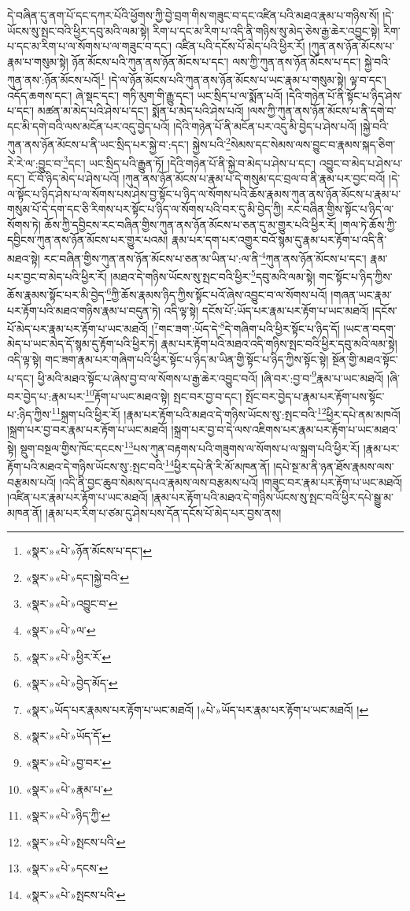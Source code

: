 དེ་བཞིན་དུ་ནག་པོ་དང་དཀར་པོའི་ཕྱོགས་ཀྱི་བྱེ་བྲག་གིས་གཟུང་བ་དང་འཛིན་པའི་མཐའ་རྣམ་པ་གཉིས་སོ། །དེ་ཡོངས་སུ་སྤང་བའི་ཕྱིར་དབུ་མའི་ལམ་སྟེ། རིག་པ་དང་མ་རིག་པ་འདི་ནི་གཉིས་སུ་མེད་ཅེས་རྒྱ་ཆེར་འབྱུང་སྟེ། རིག་པ་དང་མ་རིག་པ་ལ་སོགས་པ་ལ་གཟུང་བ་དང་། འཛིན་པའི་དངོས་པོ་མེད་པའི་ཕྱིར་རོ། །ཀུན་ནས་ཉོན་མོངས་པ་རྣམ་པ་གསུམ་སྟེ། ཉོན་མོངས་པའི་ཀུན་ནས་ཉོན་མོངས་པ་དང་། ལས་ཀྱི་ཀུན་ནས་ཉོན་མོངས་པ་དང་། སྐྱེ་བའི་ཀུན་ནས་:ཉོན་མོངས་པའོ།\footnote{«སྣར་»«པེ་»ཉོན་མོངས་པ་དང་།} །དེ་ལ་ཉོན་མོངས་པའི་ཀུན་ནས་ཉོན་མོངས་པ་ཡང་རྣམ་པ་གསུམ་སྟེ། ལྟ་བ་དང་། འདོད་ཆགས་དང་། ཞེ་སྡང་དང་། གཏི་མུག་གི་རྒྱུ་དང་། ཡང་སྲིད་པ་ལ་སྨོན་པའོ། །དེའི་གཉེན་པོ་ནི་སྟོང་པ་ཉིད་ཤེས་པ་དང་། མཚན་མ་མེད་པའི་ཤེས་པ་དང་། སྨོན་པ་མེད་པའི་ཤེས་པའོ། །ལས་ཀྱི་ཀུན་ནས་ཉོན་མོངས་པ་ནི་དགེ་བ་དང་མི་དགེ་བའི་ལས་མངོན་པར་འདུ་བྱེད་པའོ། །དེའི་གཉེན་པོ་ནི་མངོན་པར་འདུ་མི་བྱེད་པ་ཤེས་པའོ། །སྐྱེ་བའི་ཀུན་ནས་ཉོན་མོངས་པ་ནི་ཡང་སྲིད་པར་སྐྱེ་བ་:དང་། སྐྱེས་པའི་\footnote{«སྣར་»«པེ་»དང་།སྐྱེ་བའི་}སེམས་དང་སེམས་ལས་བྱུང་བ་རྣམས་སྐད་ཅིག་རེ་རེ་ལ་:བྱུང་བ་\footnote{«སྣར་»«པེ་»འབྱུང་བ་}དང་། ཡང་སྲིད་པའི་རྒྱུན་ཏོ། །དེའི་གཉེན་པོ་ནི་སྐྱེ་བ་མེད་པ་ཤེས་པ་དང་། འབྱུང་བ་མེད་པ་ཤེས་པ་དང་། ངོ་བོ་ཉིད་མེད་པ་ཤེས་པའོ། །ཀུན་ནས་ཉོན་མོངས་པ་རྣམ་པ་དེ་གསུམ་དང་བྲལ་བ་ནི་རྣམ་པར་བྱང་བའོ། །དེ་ལ་སྟོང་པ་ཉིད་ཤེས་པ་ལ་སོགས་པས་ཤེས་བྱ་སྟོང་པ་ཉིད་ལ་སོགས་པའི་ཆོས་རྣམས་ཀུན་ནས་ཉོན་མོངས་པ་རྣམ་པ་གསུམ་པོ་དེ་དག་དང་ཅི་རིགས་པར་སྟོང་པ་ཉིད་ལ་སོགས་པའི་བར་དུ་མི་བྱེད་ཀྱི། རང་བཞིན་གྱིས་སྟོང་པ་ཉིད་ལ་སོགས་ཏེ། ཆོས་ཀྱི་དབྱིངས་རང་བཞིན་གྱིས་ཀུན་ནས་ཉོན་མོངས་པ་ཅན་དུ་མ་གྱུར་པའི་ཕྱིར་རོ། །གལ་ཏེ་ཆོས་ཀྱི་དབྱིངས་ཀུན་ནས་ཉོན་མོངས་པར་གྱུར་པའམ། རྣམ་པར་དག་པར་འགྱུར་བའོ་སྙམ་དུ་རྣམ་པར་རྟོག་པ་འདི་ནི་མཐའ་སྟེ། རང་བཞིན་གྱིས་ཀུན་ནས་ཉོན་མོངས་པ་ཅན་མ་ཡིན་པ་:ལ་ནི་\footnote{«སྣར་»«པེ་»ལ་}ཀུན་ནས་ཉོན་མོངས་པ་དང་། རྣམ་པར་བྱང་བ་མེད་པའི་ཕྱིར་རོ། །མཐའ་དེ་གཉིས་ཡོངས་སུ་སྤང་བའི་ཕྱིར་\footnote{«སྣར་»«པེ་»ཕྱིར་རོ་}དབུ་མའི་ལམ་སྟེ། གང་སྟོང་པ་ཉིད་ཀྱིས་ཆོས་རྣམས་སྟོང་པར་མི་བྱེད་\footnote{«སྣར་»«པེ་»བྱེད་མོད་}ཀྱི་ཆོས་རྣམས་ཉིད་ཀྱིས་སྟོང་པའོ་ཞེས་འབྱུང་བ་ལ་སོགས་པའོ། །གཞན་ཡང་རྣམ་པར་རྟོག་པའི་མཐའ་གཉིས་རྣམ་པ་བདུན་ཏེ། འདི་ལྟ་སྟེ། དངོས་པོ་:ཡོད་པར་རྣམ་པར་རྟོག་པ་ཡང་མཐའོ། །དངོས་པོ་མེད་པར་རྣམ་པར་རྟོག་པ་ཡང་མཐའོ། །\footnote{«སྣར་»ཡོད་པར་རྣམས་པར་རྟོག་པ་ཡང་མཐའོ། །«པེ་»ཡོད་པར་རྣམ་པར་རྟོག་པ་ཡང་མཐའོ། །}གང་ཟག་:ཡོད་དེ་\footnote{«སྣར་»«པེ་»ཡོད་དོ་}དེ་གཞིག་པའི་ཕྱིར་སྟོང་པ་ཉིད་དོ། །ཡང་ན་བདག་མེད་པ་ཡང་མེད་དོ་སྙམ་དུ་རྟོག་པའི་ཕྱིར་ཏེ། རྣམ་པར་རྟོག་པའི་མཐའ་འདི་གཉིས་སྤང་བའི་ཕྱིར་དབུ་མའི་ལམ་སྟེ། འདི་ལྟ་སྟེ། གང་ཟག་རྣམ་པར་གཞིག་པའི་ཕྱིར་སྟོང་པ་ཉིད་མ་ཡིན་གྱི་སྟོང་པ་ཉིད་ཀྱིས་སྟོང་སྟེ། སྔོན་གྱི་མཐའ་སྟོང་པ་དང་། ཕྱི་མའི་མཐའ་སྟོང་པ་ཞེས་བྱ་བ་ལ་སོགས་པ་རྒྱ་ཆེར་འབྱུང་བའོ། །ཞི་བར་:བྱ་བ་\footnote{«སྣར་»«པེ་»བྱ་བར་}རྣམ་པ་ཡང་མཐའོ། །ཞི་བར་བྱེད་པ་:རྣམ་པར་\footnote{«སྣར་»«པེ་»རྣམ་པ་}རྟོག་པ་ཡང་མཐའ་སྟེ། སྤང་བར་བྱ་བ་དང་། སྤོང་བར་བྱེད་པ་རྣམ་པར་རྟོག་པས་སྟོང་པ་:ཉིད་ཀྱིས་\footnote{«སྣར་»«པེ་»ཉིད་ཀྱི་}སྐྲག་པའི་ཕྱིར་རོ། །རྣམ་པར་རྟོག་པའི་མཐའ་དེ་གཉིས་ཡོངས་སུ་:སྤང་བའི་\footnote{«སྣར་»«པེ་»སྤངས་པའི་}ཕྱིར་དཔེ་ནམ་མཁའོ། །སྐྲག་པར་བྱ་བར་རྣམ་པར་རྟོག་པ་ཡང་མཐའོ། །སྐྲག་པར་བྱ་བ་དེ་ལས་འཇིགས་པར་རྣམ་པར་རྟོག་པ་ཡང་མཐའ་སྟེ། སྡུག་བསྔལ་གྱིས་ཁོང་དངངས་\footnote{«སྣར་»«པེ་»དངས་}པས་ཀུན་བརྟགས་པའི་གཟུགས་ལ་སོགས་པ་ལ་སྐྲག་པའི་ཕྱིར་རོ། །རྣམ་པར་རྟོག་པའི་མཐའ་དེ་གཉིས་ཡོངས་སུ་:སྤང་བའི་\footnote{«སྣར་»«པེ་»སྤངས་པའི་}ཕྱིར་དཔེ་ནི་རི་མོ་མཁན་ནོ། །དཔེ་སྔ་མ་ནི་ཉན་ཐོས་རྣམས་ལས་བརྩམས་པའོ། །འདི་ནི་བྱང་ཆུབ་སེམས་དཔའ་རྣམས་ལས་བརྩམས་པའོ། །གཟུང་བར་རྣམ་པར་རྟོག་པ་ཡང་མཐའོ། །འཛིན་པར་རྣམ་པར་རྟོག་པ་ཡང་མཐའོ། །རྣམ་པར་རྟོག་པའི་མཐའ་དེ་གཉིས་ཡོངས་སུ་སྤང་བའི་ཕྱིར་དཔེ་སྒྱུ་མ་མཁན་ནོ། །རྣམ་པར་རིག་པ་ཙམ་དུ་ཤེས་པས་དོན་དངོས་པོ་མེད་པར་བྱས་ནས། 